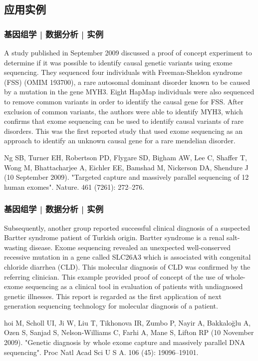 \subsection{应用实例}
\begin{frame}
  \frametitle{基因组学 | 数据分析 | 实例}
  A study published in September 2009 discussed a proof of concept experiment to determine if it was possible to identify causal genetic variants using exome sequencing. They sequenced four individuals with Freeman-Sheldon syndrome (FSS) (OMIM 193700), a rare autosomal dominant disorder known to be caused by a mutation in the gene MYH3. Eight HapMap individuals were also sequenced to remove common variants in order to identify the causal gene for FSS. After exclusion of common variants, the authors were able to identify MYH3, which confirms that exome sequencing can be used to identify causal variants of rare disorders. This was the first reported study that used exome sequencing as an approach to identify an unknown causal gene for a rare mendelian disorder.

  Ng SB, Turner EH, Robertson PD, Flygare SD, Bigham AW, Lee C, Shaffer T, Wong M, Bhattacharjee A, Eichler EE, Bamshad M, Nickerson DA, Shendure J (10 September 2009). "Targeted capture and massively parallel sequencing of 12 human exomes". Nature. 461 (7261): 272–276.
\end{frame}

\begin{frame}
  \frametitle{基因组学 | 数据分析 | 实例}
  Subsequently, another group reported successful clinical diagnosis of a suspected Bartter syndrome patient of Turkish origin. Bartter syndrome is a renal salt-wasting disease. Exome sequencing revealed an unexpected well-conserved recessive mutation in a gene called SLC26A3 which is associated with congenital chloride diarrhea (CLD). This molecular diagnosis of CLD was confirmed by the referring clinician. This example provided proof of concept of the use of whole-exome sequencing as a clinical tool in evaluation of patients with undiagnosed genetic illnesses. This report is regarded as the first application of next generation sequencing technology for molecular diagnosis of a patient.

  hoi M, Scholl UI, Ji W, Liu T, Tikhonova IR, Zumbo P, Nayir A, Bakkaloğlu A, Ozen S, Sanjad S, Nelson-Williams C, Farhi A, Mane S, Lifton RP (10 November 2009). "Genetic diagnosis by whole exome capture and massively parallel DNA sequencing". Proc Natl Acad Sci U S A. 106 (45): 19096–19101. 
\end{frame}

